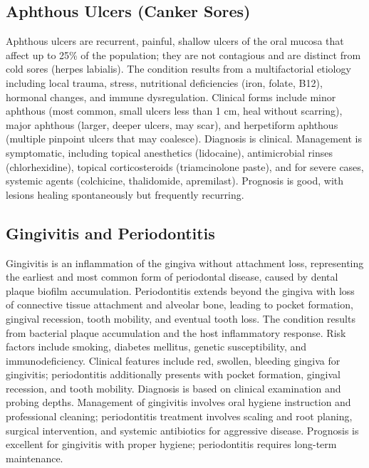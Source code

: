 \subsection{Aphthous Ulcers (Canker Sores)}
\label{sec:Aphthous Ulcers (Canker Sores)}
Aphthous ulcers are recurrent, painful, shallow ulcers of the oral mucosa that affect up to 25\% of the population; they are not contagious and are distinct from cold sores (herpes labialis). The condition results from a multifactorial etiology including local trauma, stress, nutritional deficiencies (iron, folate, B12), hormonal changes, and immune dysregulation. Clinical forms include minor aphthous (most common, small ulcers less than 1 cm, heal without scarring), major aphthous (larger, deeper ulcers, may scar), and herpetiform aphthous (multiple pinpoint ulcers that may coalesce). Diagnosis is clinical. Management is symptomatic, including topical anesthetics (lidocaine), antimicrobial rinses (chlorhexidine), topical corticosteroids (triamcinolone paste), and for severe cases, systemic agents (colchicine, thalidomide, apremilast). Prognosis is good, with lesions healing spontaneously but frequently recurring.

\subsection{Gingivitis and Periodontitis}
\label{sec:Gingivitis and Periodontitis}
Gingivitis is an inflammation of the gingiva without attachment loss, representing the earliest and most common form of periodontal disease, caused by dental plaque biofilm accumulation. Periodontitis extends beyond the gingiva with loss of connective tissue attachment and alveolar bone, leading to pocket formation, gingival recession, tooth mobility, and eventual tooth loss. The condition results from bacterial plaque accumulation and the host inflammatory response. Risk factors include smoking, diabetes mellitus, genetic susceptibility, and immunodeficiency. Clinical features include red, swollen, bleeding gingiva for gingivitis; periodontitis additionally presents with pocket formation, gingival recession, and tooth mobility. Diagnosis is based on clinical examination and probing depths. Management of gingivitis involves oral hygiene instruction and professional cleaning; periodontitis treatment involves scaling and root planing, surgical intervention, and systemic antibiotics for aggressive disease. Prognosis is excellent for gingivitis with proper hygiene; periodontitis requires long-term maintenance.


